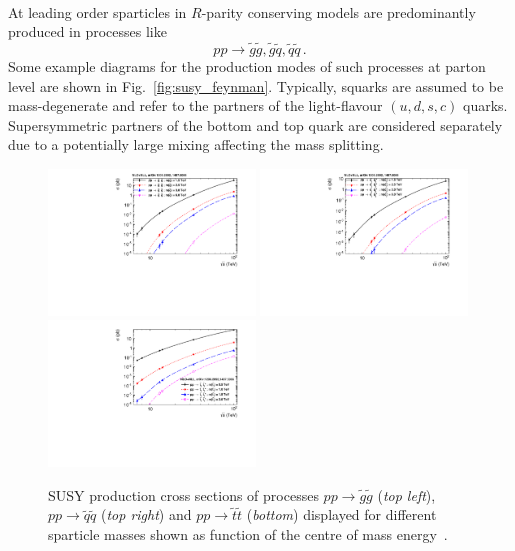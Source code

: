 \\
At leading order sparticles in $R$-parity conserving models are predominantly produced in processes like~\cite{Kane:1982hw, Harrison:1982yi, Reya:1984yz, Dawson:1983fw, Baer:1985xz}
\begin{equation}
 pp \rightarrow \tilde{g}\tilde{g}, \tilde{g}\tilde{q}, \tilde{q}\tilde{q} \, .
\end{equation}
Some example diagrams for the production modes of such processes at parton level are shown in Fig.~\ref{fig:susy_feynman}. Typically, squarks are assumed to be mass-degenerate and refer to the partners of the light-flavour $(u, d, s, c)$ quarks. Supersymmetric partners of the bottom and top quark are considered separately due to a potentially large mixing affecting the mass splitting.
\begin{figure}[!t]
  \centering
  \begin{minipage}[c]{1.\textwidth}
    \begin{center}
      \includegraphics[width=0.49\textwidth]{figures/gluino_xsec.pdf}  
      \includegraphics[width=0.49\textwidth]{figures/squark_xsec.pdf} \\
      \includegraphics[width=0.49\textwidth]{figures/stop_xsec.pdf}
    \end{center}
  \end{minipage}
  \caption{SUSY production cross sections of processes $pp \rightarrow \tilde{g}\tilde{g}$ (\textit{top left}), $pp \rightarrow \tilde{q}\tilde{q}$ (\textit{top right}) and $pp \rightarrow \tilde{t}\tilde{t}$ (\textit{bottom}) displayed for different sparticle masses shown as function of the centre of mass energy~\cite{Kramer:2012bx, Borschensky:2014cia}.}
  \label{fig:susy_cross_sec}
\end{figure}

